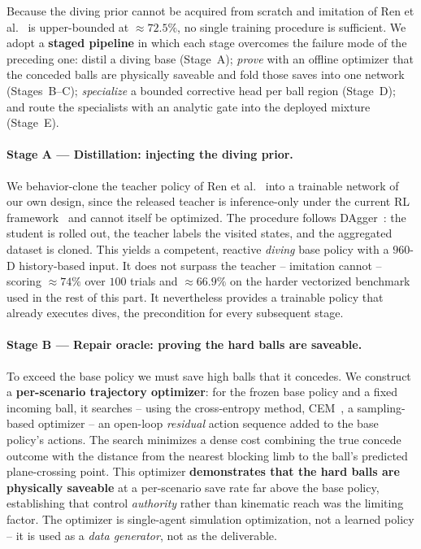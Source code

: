 \documentclass{article}
\begin{document}
Because the diving prior cannot be acquired from scratch and imitation of
Ren et al.~\cite{ren} is upper-bounded at $\approx 72.5\%$, no single training
procedure is sufficient. We adopt a \textbf{staged pipeline} in which each stage
overcomes the failure mode of the preceding one: distil a diving base
(Stage~A); \emph{prove} with an offline optimizer that the conceded balls are
physically saveable and fold those saves into one network (Stages~B--C);
\emph{specialize} a bounded corrective head per ball region (Stage~D); and route
the specialists with an analytic gate into the deployed mixture (Stage~E).

\paragraph{Stage A --- Distillation: injecting the diving prior.}

We behavior-clone the teacher policy of Ren et al.~\cite{ren} into a trainable
network of our own design, since the released teacher is inference-only under
the current RL framework~\cite{rudin} and cannot itself be optimized. The
procedure follows DAgger~\cite{dagger}: the student is rolled out, the teacher
labels the visited states, and the aggregated dataset is cloned. This yields a
competent, reactive \emph{diving} base policy with a $960$-D history-based
input. It does not surpass the teacher -- imitation cannot -- scoring
$\approx 74\%$ over $100$ trials and $\approx \mathbf{66.9\%}$
on the harder vectorized benchmark used in the rest of this part. It nevertheless
provides a trainable policy that already executes dives, the precondition for
every subsequent stage.

\paragraph{Stage B --- Repair oracle: proving the hard balls are saveable.}

To exceed the base policy we must save high balls that it concedes. We construct
a \textbf{per-scenario trajectory optimizer}: for the frozen base policy and a
fixed incoming ball, it searches -- using the cross-entropy method,
CEM~\cite{cem,icem}, a sampling-based optimizer -- an open-loop \emph{residual}
action sequence added to the base policy's actions. The search minimizes a dense
cost combining the true concede outcome with the distance from the nearest
blocking limb to the ball's predicted plane-crossing point. This optimizer
\textbf{demonstrates that the hard balls are physically saveable} at a
per-scenario save rate far above the base policy, establishing that control
\emph{authority} rather than kinematic reach was the limiting factor. The
optimizer is single-agent simulation optimization, not a learned policy -- it is
used as a \emph{data generator}, not as the deliverable.
\end{document}

